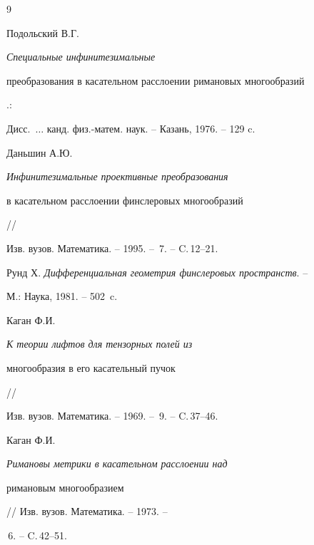 \begin{thebibliography}{9}







Подольский В.Г. {\em Специальные инфинитезимальные 


преобразования в касательном расслоении римановых многообразий}.:


Дисс.~$\dotsc$ канд. физ.-матем. наук. -- Казань, 1976. -- 129 c.




Даньшин А.Ю. {\em Инфинитезимальные проективные преобразования


в касательном расслоении финслеровых многообразий} // 


Изв. вузов. Математика. -- 1995. -- \No\,7. -- C.\,12--21.




Рунд Х. {\em Дифференциальная геометрия финслеровых пространств}. --


М.: Наука, 1981. -- 502~c.




Каган Ф.И. {\em К теории лифтов для тензорных полей из 


многообразия в его касательный пучок} //


Изв. вузов. Математика. -- 1969. -- \No\,9. -- C.\,37--46.




Каган Ф.И. {\em Римановы метрики в касательном расслоении над 


римановым многообразием} // Изв. вузов. Математика. -- 1973. --


\No\,6. -- C.\,42--51.





\end{thebibliography}





\vskip 2cm












\label{end}





